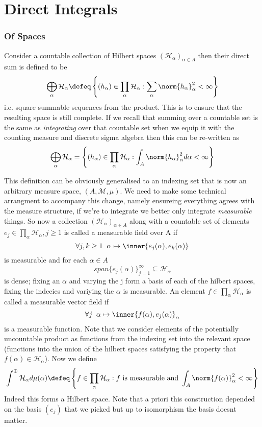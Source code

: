 \chapter{Direct Integrals}\label{app:direct_int}
\subsection{Of Spaces}
    Consider a countable collection of Hilbert spaces \((\mathcal{H}_\alpha)_{\alpha\in A}\) then their direct sum is defined to be 
    \[\bigoplus_{\alpha} \mathcal{H}_\alpha \defeq \left\{(h_\alpha)\in \prod_\alpha \mathcal{H}_\alpha : \sum_\alpha \norm{h_\alpha}_\alpha^2 < \infty\right\}\]
    i.e. square summable sequences from the product. This is to ensure that the resulting space is still complete. If we recall that summing over a countable set is the same as \textit{integrating} over that countable set when we equip it with the counting measure and discrete sigma algebra then this can be re-written as 
    \[\bigoplus_{\alpha} \mathcal{H}_\alpha = \left\{(h_\alpha)\in \prod_\alpha \mathcal{H}_\alpha : \int_A \norm{h_\alpha}^2_\alpha d\alpha < \infty\right\}\]

    This definition can be obviously generalised to an indexing set that is now an arbitrary measure space, \((A, \mathcal{M}, \mu)\). We need to make some technical arrangment to accompany this change, namely ensureing everything agrees with the measure structure, if we're to integrate we better only integrate \textit{measurable} things. So now a collection \((\mathcal{H}_\alpha)_{\alpha\in A}\) along with a countable set of elements \(e_j \in \prod_\alpha \mathcal{H}_\alpha, j\geq 1\) is called a measurable field over A if 
    \[\forall j,k\geq 1 \;\; \alpha \mapsto \inner{e_j(\alpha), e_k(\alpha)}\]
    is measurable and for each \(\alpha \in A\) 
    \[span\{e_j(\alpha)\}_{j=1}^\infty \subseteq \mathcal{H}_\alpha\]
    is dense; fixing an \(\alpha\) and varying the j form a basis of each of the hilbert spaces, fixing the indecies and variying the \(\alpha\) is measurable. An element \(f \in \prod_\alpha \mathcal{H}_\alpha\) is called a measurable vector field if 
    \[\forall j \;\; \alpha \mapsto \inner{f(\alpha), e_j(\alpha)}_\alpha\]
    is a measurable function. Note that we consider elements of the potentially uncountable product as functions from the indexing set into the relevant space (functions into the union of the hilbert spaces satisfying the property that \(f(\alpha)\in \mathcal{H}_\alpha\)). Now we define 
    \[\int^\oplus \mathcal{H}_\alpha d\mu(\alpha) \defeq \left\{f\in \prod_\alpha \mathcal{H}_\alpha : f \text{ is measurable and } \int_A \norm{f(\alpha)}_\alpha^2 < \infty \right\}\] 
    Indeed this forms a Hilbert space. Note that a priori this construction depended on the basis \((e_j)\) that we picked but up to isomorphism the basis doesnt matter. 

